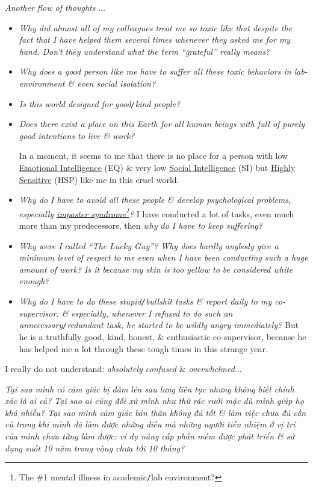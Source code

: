 \documentclass[12pt,oneside]{book}
\begin{document}
{\it Another flow of thoughts} $\ldots$
\begin{itemize}
	\setlength\itemsep{0em}
	\item {\it Why did almost all of my colleagues treat me so toxic like that despite the fact that I have helped them several times whenever they asked me for my hand. Don't they understand what the term ``grateful'' really means?}
	\item {\it Why does a good person like me have to suffer all these toxic behaviors in lab-environment \& even social isolation?}
	\item {\it Is this world designed for good{\tt/}kind people?}
	\item {\it Does there exist a place on this Earth for all human beings with full of purely good intentions to live \& work?}
	
	In a moment, it seems to me that there is no place for a person with low \href{https://en.wikipedia.org/wiki/Emotional_intelligence}{Emotional Intelligence} (EQ) \& very low \href{https://en.wikipedia.org/wiki/Social_intelligence}{Social Intelligence} (SI) but \href{https://hsperson.com/}{Highly Sensitive} (HSP) like me in this cruel world.    
	\item {\it Why do I have to avoid all these people \& develop psychological problems, especially \href{https://en.wikipedia.org/wiki/Impostor_syndrome}{imposter syndrome}\footnote{The \#1 mental illness in academic{\tt/}lab environment?}?} I have conducted a lot of tasks, even much more than my predecessors, then {\it why do I have to keep suffering?}
	\item {\it Why were I called ``The Lucky Guy''? Why does hardly anybody give a minimum level of respect to me even when I have been conducting such a huge amount of work? Is it because my skin is too yellow to be considered white enough?}
	\item {\it Why do I have to do these stupid{\tt/}bullshit tasks \& report daily to my co-supervisor. \& especially, whenever I refused to do such an unnecessary{\tt/}redundant task, he started to be wildly angry immediately?} But he is a truthfully good, kind, honest, \& enthusiastic co-supervisor, because he has helped me a lot through these tough times in this strange year.
\end{itemize}
I really do not understand: {\it absolutely confused} \& {\it overwhelmed}$\ldots$

{\it Tại sao mình có cảm giác bị đâm lén sau lưng liên tục nhưng không biết chính xác là ai cả? Tại sao ai cũng đối xử mình như thứ rác rưởi mặc dù mình giúp họ khá nhiều? Tại sao mình cảm giác bản thân không đủ tốt \& làm việc chưa đủ cần cù trong khi mình đã làm được những điều mà những người tiền nhiệm ở vị trí của mình chưa từng làm được: ví dụ nâng cấp phần mềm được phát triển \& sử dụng suốt 10 năm trong vòng chưa tới 10 tháng?}
\end{document}
